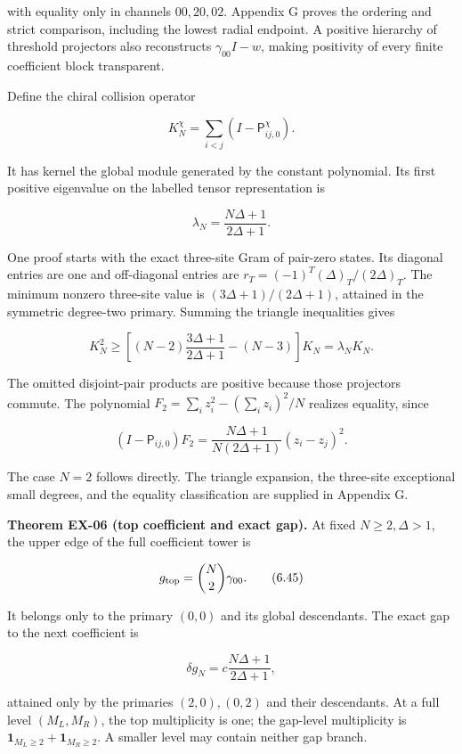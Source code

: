 \documentclass[a4paper,11pt]{article}
\numberwithin{equation}{section}
\begin{document}
with equality only in channels \(00,20,02\). Appendix G proves the ordering and strict comparison, including the lowest radial endpoint. A positive hierarchy of threshold projectors also reconstructs \(\gamma_{00}I-w\), making positivity of every finite coefficient block transparent.

Define the chiral collision operator

\[
K_N^\chi=\sum_{i<j}(I-\mathsf P^\chi_{ij,0}).
\tag{6.41}
\]

It has kernel the global module generated by the constant polynomial. Its first positive eigenvalue on the labelled tensor representation is

\[
\lambda_N=\frac{N\Delta+1}{2\Delta+1}.
\tag{6.42}
\]

One proof starts with the exact three-site Gram of pair-zero states. Its diagonal entries are one and off-diagonal entries are \(r_T=(-1)^T(\Delta)_T/(2\Delta)_T\). The minimum nonzero three-site value is \((3\Delta+1)/(2\Delta+1)\), attained in the symmetric degree-two primary. Summing the triangle inequalities gives

\[
K_N^2\ge\left[(N-2)\frac{3\Delta+1}{2\Delta+1}-(N-3)\right]K_N
=\lambda_NK_N.
\tag{6.43}
\]

The omitted disjoint-pair products are positive because those projectors commute. The polynomial \(F_2=\sum_i z_i^2-(\sum_i z_i)^2/N\) realizes equality, since

\[
(I-\mathsf P_{ij,0})F_2
=\frac{N\Delta+1}{N(2\Delta+1)}(z_i-z_j)^2.
\tag{6.44}
\]

The case \(N=2\) follows directly. The triangle expansion, the three-site exceptional small degrees, and the equality classification are supplied in Appendix G.

\textbf{Theorem EX-06 (top coefficient and exact gap).} At fixed \(N\ge2,\Delta>1\), the upper edge of the full coefficient tower is

\[
g_{\rm top}=\binom N2\gamma_{00}.
\tag{6.45}
\]

It belongs only to the primary \((0,0)\) and its global descendants. The exact gap to the next coefficient is

\[
\delta g_N=c\frac{N\Delta+1}{2\Delta+1},
\tag{6.46}
\]

attained only by the primaries \((2,0),(0,2)\) and their descendants. At a full level \((M_L,M_R)\), the top multiplicity is one; the gap-level multiplicity is \(\mathbf1_{M_L\ge2}+\mathbf1_{M_R\ge2}\). A smaller level may contain neither gap branch.
\end{document}
